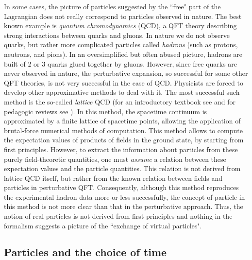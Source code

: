 \documentclass[12pt]{article}
\begin{document}
In some cases, the picture of particles suggested by the 
``free" part of the Lagrangian does not really correspond 
to particles observed in nature. The best known 
example is {\em quantum chromodynamics} (QCD), a QFT theory 
describing strong interactions between quarks and gluons.
In nature we do not observe quarks, but rather more complicated
particles called {\em hadrons} (such as protons, neutrons, 
and pions). In an oversimplified but often abused picture, 
hadrons are built of 2 or 3 quarks glued together
by gluons. However, since free quarks are never observed in nature,
the perturbative expansion, so successful for some other 
QFT theories, is not very successful in the case of QCD.
Physicists are forced to develop other approximative 
methods to deal with it. The most successful such method 
is the so-called {\em lattice} QCD (for an introductory 
textbook see \cite{creutz} and for pedagogic reviews
see \cite{davies,sharpe}). In this method, the spacetime 
continuum is approximated by a finite lattice
of spacetime points, allowing the application 
of brutal-force numerical methods of computation.
This method allows to compute the expectation values of 
products of fields in the ground state, by starting from first 
principles. However, to extract the information about 
particles from these purely field-theoretic quantities, one must 
{\em assume} a relation between these expectation values
and the particle quantities. This relation is not derived 
from lattice QCD itself, but rather from the known 
relation between fields and particles in perturbative QFT.  
Consequently, although this method reproduces the experimental
hadron data more-or-less successfully, 
the concept of particle in this method is 
not more clear than that in the perturbative approach.
Thus, the notion of real particles
is not derived from first principles
and nothing in the formalism 
suggests a picture of the ``exchange of virtual particles".         

\subsection{Particles and the choice of time}
\end{document}
